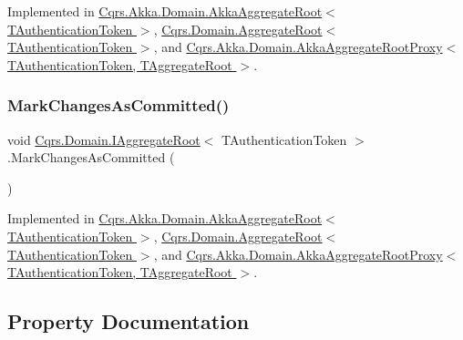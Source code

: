 Implemented in \hyperlink{classCqrs_1_1Akka_1_1Domain_1_1AkkaAggregateRoot_af6d84b07d4e9475bb88e769ac9081830}{Cqrs.\+Akka.\+Domain.\+Akka\+Aggregate\+Root$<$ T\+Authentication\+Token $>$}, \hyperlink{classCqrs_1_1Domain_1_1AggregateRoot_aec873ad6e4c98309cad2d9f1c534aebb}{Cqrs.\+Domain.\+Aggregate\+Root$<$ T\+Authentication\+Token $>$}, and \hyperlink{classCqrs_1_1Akka_1_1Domain_1_1AkkaAggregateRootProxy_ae611077a51a215aef7fd0e106734b386}{Cqrs.\+Akka.\+Domain.\+Akka\+Aggregate\+Root\+Proxy$<$ T\+Authentication\+Token, T\+Aggregate\+Root $>$}.

\mbox{\label{interfaceCqrs_1_1Domain_1_1IAggregateRoot_af31116870bbf6566b3eec0b8bc02c6de}} 
\subsubsection{\texorpdfstring{Mark\+Changes\+As\+Committed()}{MarkChangesAsCommitted()}}
{\footnotesize\ttfamily void \hyperlink{interfaceCqrs_1_1Domain_1_1IAggregateRoot}{Cqrs.\+Domain.\+I\+Aggregate\+Root}$<$ T\+Authentication\+Token $>$.Mark\+Changes\+As\+Committed (\begin{DoxyParamCaption}{ }\end{DoxyParamCaption})}



Implemented in \hyperlink{classCqrs_1_1Akka_1_1Domain_1_1AkkaAggregateRoot_a0d2615067175e5f8249bb2dc3d17ee0b}{Cqrs.\+Akka.\+Domain.\+Akka\+Aggregate\+Root$<$ T\+Authentication\+Token $>$}, \hyperlink{classCqrs_1_1Domain_1_1AggregateRoot_adab968b830e186cb832583910bf6f3a6}{Cqrs.\+Domain.\+Aggregate\+Root$<$ T\+Authentication\+Token $>$}, and \hyperlink{classCqrs_1_1Akka_1_1Domain_1_1AkkaAggregateRootProxy_aaa8a46fee21b6133ae4d1b2f60983d7e}{Cqrs.\+Akka.\+Domain.\+Akka\+Aggregate\+Root\+Proxy$<$ T\+Authentication\+Token, T\+Aggregate\+Root $>$}.



\subsection{Property Documentation}
\mbox{\label{interfaceCqrs_1_1Domain_1_1IAggregateRoot_a04aa3198f1371afa345a58e8fcb713d7}} 
